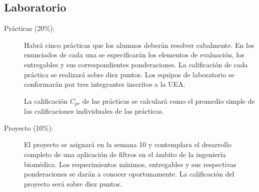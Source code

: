 \documentclass[letterpaper, 11pt]{article}
\begin{document}
	\subsection{Laboratorio}
  	\begin{description}
  	  \item [Prácticas (20\%):] Habrá cinco prácticas que los alumnos deberán resolver cabalmente. En los enunciados de cada una se especificarán los elementos de evaluación, los entregables y sus correspondientes ponderaciones. La calificación de cada práctica se realizará sobre diez puntos. Los equipos de laboratorio se conformarán por tres integrantes inscritos a la UEA.
  	  
  	  La calificación $C_{pr}$ de las prácticas se calculará como el promedio simple de las calificaciones individuales de las prácticas.
  	  
  	  \item [Proyecto (10\%):] El proyecto se asignará en la semana 10 y contemplara el desarrollo completo de una aplicación de filtros en el ámbito de la ingeniería biomédica. Los requerimientos mínimos, entregables y sus respectivas ponderaciones se darán a conocer oportunamente. La calificación del proyecto será sobre diez puntos. %
  	  

\end{description}
\end{document}
